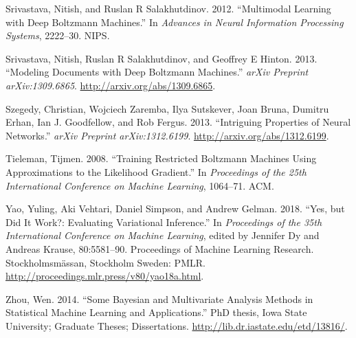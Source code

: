 \documentclass[AMS,STIX1COL]{WileyNJD-v2}
\begin{document}
\leavevmode\hypertarget{ref-srivastava2012multimodal}{}%
Srivastava, Nitish, and Ruslan R Salakhutdinov. 2012. ``Multimodal
Learning with Deep Boltzmann Machines.'' In \emph{Advances in Neural
Information Processing Systems}, 2222--30. NIPS.

\leavevmode\hypertarget{ref-srivastava2013modeling}{}%
Srivastava, Nitish, Ruslan R Salakhutdinov, and Geoffrey E Hinton. 2013.
``Modeling Documents with Deep Boltzmann Machines.'' \emph{arXiv
Preprint arXiv:1309.6865}. \url{http://arxiv.org/abs/1309.6865}.

\leavevmode\hypertarget{ref-szegedy2013intriguing}{}%
Szegedy, Christian, Wojciech Zaremba, Ilya Sutskever, Joan Bruna,
Dumitru Erhan, Ian J. Goodfellow, and Rob Fergus. 2013. ``Intriguing
Properties of Neural Networks.'' \emph{arXiv Preprint arXiv:1312.6199}.
\url{http://arxiv.org/abs/1312.6199}.

\leavevmode\hypertarget{ref-tieleman2008training}{}%
Tieleman, Tijmen. 2008. ``Training Restricted Boltzmann Machines Using
Approximations to the Likelihood Gradient.'' In \emph{Proceedings of the
25th International Conference on Machine Learning}, 1064--71. ACM.

\leavevmode\hypertarget{ref-pmlr-v80-yao18a}{}%
Yao, Yuling, Aki Vehtari, Daniel Simpson, and Andrew Gelman. 2018.
``Yes, but Did It Work?: Evaluating Variational Inference.'' In
\emph{Proceedings of the 35th International Conference on Machine
Learning}, edited by Jennifer Dy and Andreas Krause, 80:5581--90.
Proceedings of Machine Learning Research. Stockholmsmässan, Stockholm
Sweden: PMLR. \url{http://proceedings.mlr.press/v80/yao18a.html}.

\leavevmode\hypertarget{ref-zhou2014some}{}%
Zhou, Wen. 2014. ``Some Bayesian and Multivariate Analysis Methods in
Statistical Machine Learning and Applications.'' PhD thesis, Iowa State
University; Graduate Theses; Dissertations.
\url{http://lib.dr.iastate.edu/etd/13816/}.


%
\end{document}
